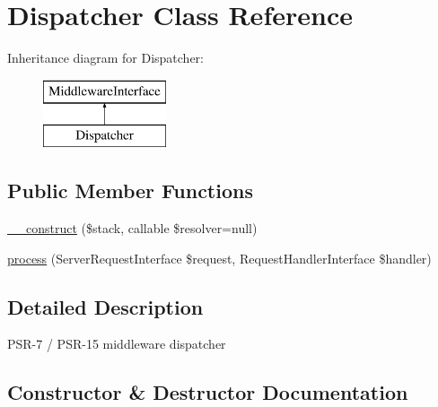 \hypertarget{class_pes_1_1_middleware_1_1_dispatcher}{}\section{Dispatcher Class Reference}
\label{class_pes_1_1_middleware_1_1_dispatcher}
Inheritance diagram for Dispatcher\+:\begin{figure}[H]
\begin{center}
\leavevmode
\includegraphics[height=2.000000cm]{class_pes_1_1_middleware_1_1_dispatcher}
\end{center}
\end{figure}
\subsection*{Public Member Functions}
\begin{DoxyCompactItemize}
\item 
\mbox{\hyperlink{class_pes_1_1_middleware_1_1_dispatcher_ab8e95e75b2f8160b541d9f45e9d5691e}{\+\_\+\+\_\+construct}} (\$stack, callable \$resolver=null)
\item 
\mbox{\hyperlink{class_pes_1_1_middleware_1_1_dispatcher_ab7b53bcad05abdc42206f7b2ac87a88a}{process}} (Server\+Request\+Interface \$request, Request\+Handler\+Interface \$handler)
\end{DoxyCompactItemize}


\subsection{Detailed Description}
P\+S\+R-\/7 / P\+S\+R-\/15 middleware dispatcher 

\subsection{Constructor \& Destructor Documentation}
\mbox{\label{class_pes_1_1_middleware_1_1_dispatcher_ab8e95e75b2f8160b541d9f45e9d5691e}} 
